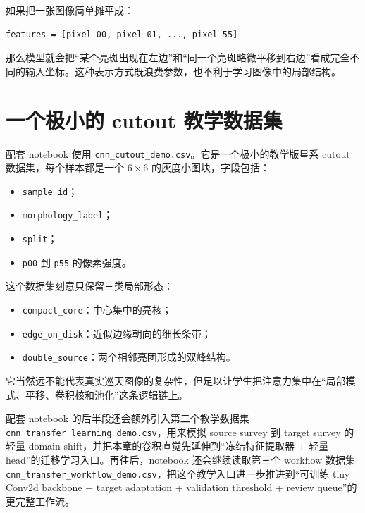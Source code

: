 如果把一张图像简单摊平成：

\begin{examplebox}[像素摊平的做法]
\begin{lstlisting}[style=pythonstyle]
features = [pixel_00, pixel_01, ..., pixel_55]
\end{lstlisting}
\end{examplebox}

那么模型就会把“某个亮斑出现在左边”和“同一个亮斑略微平移到右边”看成完全不同的输入坐标。这种表示方式既浪费参数，也不利于学习图像中的局部结构。

\section{一个极小的 cutout 教学数据集}

配套 notebook 使用 \nolinkurl{cnn_cutout_demo.csv}。它是一个极小的教学版星系 cutout 数据集，每个样本都是一个 \(6\times 6\) 的灰度小图块，字段包括：

\begin{itemize}
    \item \texttt{sample\_id}；
    \item \texttt{morphology\_label}；
    \item \texttt{split}；
    \item \texttt{p00} 到 \texttt{p55} 的像素强度。
\end{itemize}

这个数据集刻意只保留三类局部形态：

\begin{itemize}
    \item \texttt{compact\_core}：中心集中的亮核；
    \item \texttt{edge\_on\_disk}：近似边缘朝向的细长条带；
    \item \texttt{double\_source}：两个相邻亮团形成的双峰结构。
\end{itemize}

它当然远不能代表真实巡天图像的复杂性，但足以让学生把注意力集中在“局部模式、平移、卷积核和池化”这条逻辑链上。

配套 notebook 的后半段还会额外引入第二个教学数据集 \nolinkurl{cnn_transfer_learning_demo.csv}，用来模拟 source survey 到 target survey 的轻量 domain shift，并把本章的卷积直觉先延伸到“冻结特征提取器 + 轻量 head”的迁移学习入口。再往后，notebook 还会继续读取第三个 workflow 数据集 \nolinkurl{cnn_transfer_workflow_demo.csv}，把这个教学入口进一步推进到“可训练 tiny Conv2d backbone + target adaptation + validation threshold + review queue”的更完整工作流。

